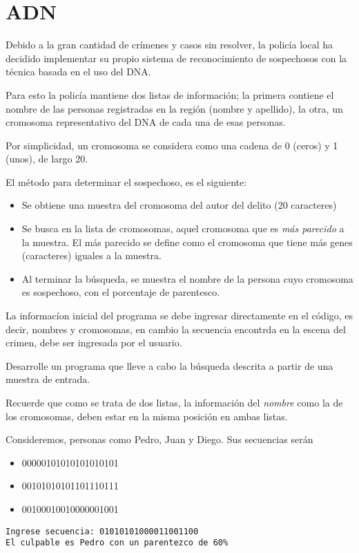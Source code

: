 \section{ADN}

Debido a la gran cantidad de crímenes y casos sin resolver, la policía
local ha decidido implementar su propio sistema de reconocimiento de
sospechosos con la técnica basada en el uso del DNA.

Para esto la policía mantiene dos listas de información; la primera
contiene el nombre de las personas registradas en la región (nombre y
apellido), la otra, un cromosoma representativo del DNA de cada una de
esas personas.

Por simplicidad, un cromosoma se considera como una cadena de 0 (ceros)
y 1 (unos), de largo 20.

El método para determinar el sospechoso, es el siguiente:

\begin{itemize}
\item
  Se obtiene una muestra del cromosoma del autor del delito (20
  caracteres)
\item
  Se busca en la lista de cromosomas, aquel cromosoma que es \emph{más
  parecido} a la muestra. El más parecido se define como el cromosoma
  que tiene más genes (caracteres) iguales a la muestra.
\item
  Al terminar la búsqueda, se muestra el nombre de la persona cuyo
  cromosoma es sospechoso, con el porcentaje de parentesco.
\end{itemize}

La informacíon inicial del programa se debe ingresar directamente en el
código, es decir, nombres y cromosomas, en cambio la secuencia encontrda
en la escena del crimen, debe ser ingresada por el usuario.

Desarrolle un programa que lleve a cabo la búsqueda descrita a partir de
una muestra de entrada.

Recuerde que como se trata de dos listas, la información del
\emph{nombre} como la de los cromosomas, deben estar en la misma
posición en ambas listas.

Consideremos, personas como Pedro, Juan y Diego. Sus secuencias serán

\begin{itemize}
\item
  00000101010101010101
\item
  00101010101101110111
\item
  00100010010000001001
\end{itemize}

\begin{lstlisting}
Ingrese secuencia: 01010101000011001100
El culpable es Pedro con un parentezco de 60%   
\end{lstlisting}

